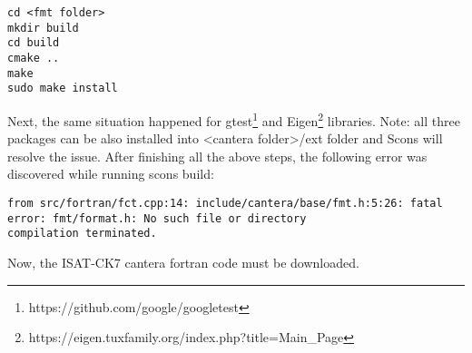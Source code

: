 \documentclass[12pt,english]{article}
\begin{document}
\begin{lstlisting}
cd <fmt folder>
mkdir build
cd build
cmake ..
make 
sudo make install
\end{lstlisting}
Next, the same situation happened for gtest\footnote{https://github.com/google/googletest} and Eigen\footnote{https://eigen.tuxfamily.org/index.php?title=Main_Page} libraries. {{{Note: all three packages can be also installed into <cantera folder>/ext folder and Scons will resolve the issue}}}. After finishing all the above steps, the following error was discovered while running scons build:
\begin{lstlisting}
from src/fortran/fct.cpp:14: include/cantera/base/fmt.h:5:26: fatal error: fmt/format.h: No such file or directory
compilation terminated.
\end{lstlisting}
	


Now, the ISAT-CK7 cantera fortran code must be downloaded.
	
\end{document}
